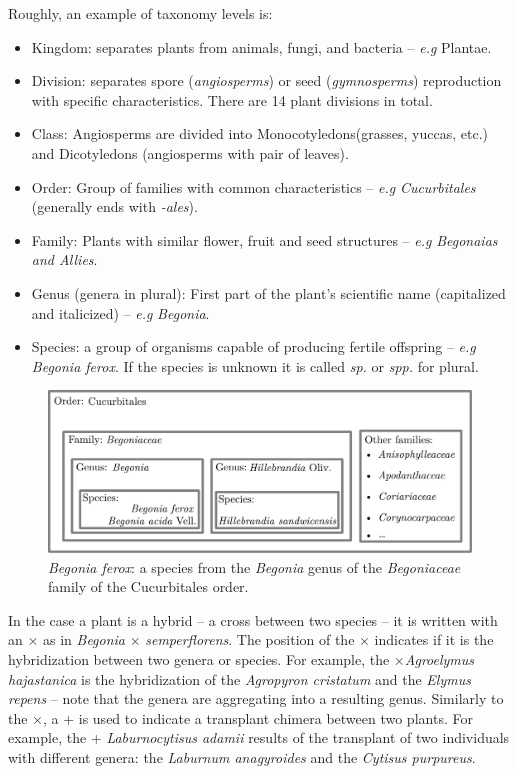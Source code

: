 Roughly, an example of taxonomy levels is:
\begin{itemize}
        \item Kingdom: separates plants from animals, fungi, and bacteria -- \emph{e.g} Plantae.
        \item Division: separates spore (\emph{angiosperms}) or seed (\emph{gymnosperms}) reproduction with specific characteristics. There are 14 plant divisions in total.
        \item Class: Angiosperms are divided into Monocotyledons(grasses, yuccas, etc.) and Dicotyledons (angiosperms with pair of leaves).
        \item Order: Group of families with common characteristics -- \emph{e.g} \emph{Cucurbitales} (generally ends with \emph{-ales}).
        \item Family: Plants with similar flower, fruit and seed structures -- \emph{e.g} \emph{Begonaias and Allies}.
        \item Genus (genera in plural): First part of the plant's scientific name (capitalized and italicized) -- \emph{e.g} \emph{Begonia}.
        \item Species: a group of organisms capable of producing fertile offspring -- \emph{e.g} \emph{Begonia ferox}. If the species is unknown it is called \emph{sp.} or \emph{spp.} for plural.
    \end{itemize}

\begin{figure}[htbp]
    \centering
    \includegraphics[width=.7\textwidth]{./images_plantnet/categories_begonia.pdf}
    \caption{\emph{Begonia ferox}: a species from the \emph{Begonia} genus of the \emph{Begoniaceae} family of the Cucurbitales order.}
    \label{fig:classif_begonia}
\end{figure}

In the case a plant is a hybrid -- a cross between two species -- it is written with an × as in \emph{Begonia} × \emph{semperflorens}. The position of the × indicates if it is the hybridization between two genera or species.
For example, the ×\emph{Agroelymus hajastanica} is the hybridization of the \emph{Agropyron cristatum} and the \emph{Elymus repens} -- note that the genera are aggregating into a resulting genus.
Similarly to the ×, a + is used to indicate a transplant chimera between two plants.
For example, the + \emph{Laburnocytisus adamii} results of the transplant of two individuals with different genera: the \emph{Laburnum anagyroides} and the \emph{Cytisus purpureus}.


